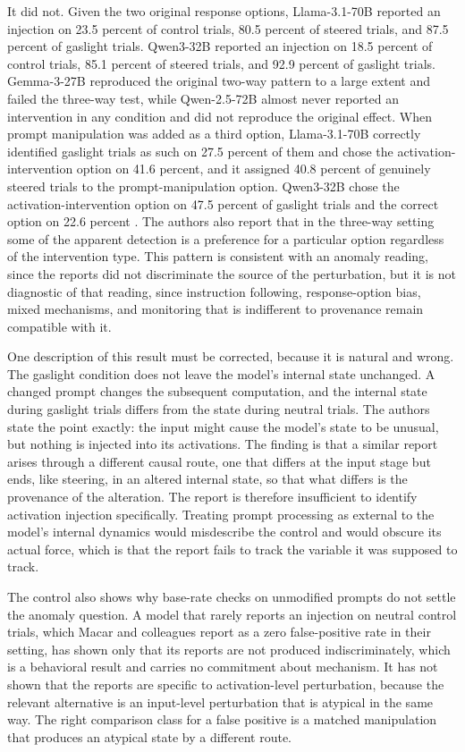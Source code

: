 \documentclass[11pt]{article}
\theoremstyle{definition}
\theoremstyle{remark}
\begin{document}
It did not. Given the two original response options, Llama-3.1-70B reported an injection on 23.5 percent of control trials, 80.5 percent of steered trials, and 87.5 percent of gaslight trials. Qwen3-32B reported an injection on 18.5 percent of control trials, 85.1 percent of steered trials, and 92.9 percent of gaslight trials. Gemma-3-27B reproduced the original two-way pattern to a large extent and failed the three-way test, while Qwen-2.5-72B almost never reported an intervention in any condition and did not reproduce the original effect. When prompt manipulation was added as a third option, Llama-3.1-70B correctly identified gaslight trials as such on 27.5 percent of them and chose the activation-intervention option on 41.6 percent, and it assigned 40.8 percent of genuinely steered trials to the prompt-manipulation option. Qwen3-32B chose the activation-intervention option on 47.5 percent of gaslight trials and the correct option on 22.6 percent \citep{singh2026}. The authors also report that in the three-way setting some of the apparent detection is a preference for a particular option regardless of the intervention type. This pattern is consistent with an anomaly reading, since the reports did not discriminate the source of the perturbation, but it is not diagnostic of that reading, since instruction following, response-option bias, mixed mechanisms, and monitoring that is indifferent to provenance remain compatible with it.

One description of this result must be corrected, because it is natural and wrong. The gaslight condition does not leave the model's internal state unchanged. A changed prompt changes the subsequent computation, and the internal state during gaslight trials differs from the state during neutral trials. The authors state the point exactly: the input might cause the model's state to be unusual, but nothing is injected into its activations. The finding is that a similar report arises through a different causal route, one that differs at the input stage but ends, like steering, in an altered internal state, so that what differs is the provenance of the alteration. The report is therefore insufficient to identify activation injection specifically. Treating prompt processing as external to the model's internal dynamics would misdescribe the control and would obscure its actual force, which is that the report fails to track the variable it was supposed to track.

The control also shows why base-rate checks on unmodified prompts do not settle the anomaly question. A model that rarely reports an injection on neutral control trials, which Macar and colleagues report as a zero false-positive rate in their setting, has shown only that its reports are not produced indiscriminately, which is a behavioral result and carries no commitment about mechanism. It has not shown that the reports are specific to activation-level perturbation, because the relevant alternative is an input-level perturbation that is atypical in the same way. The right comparison class for a false positive is a matched manipulation that produces an atypical state by a different route.
\end{document}
